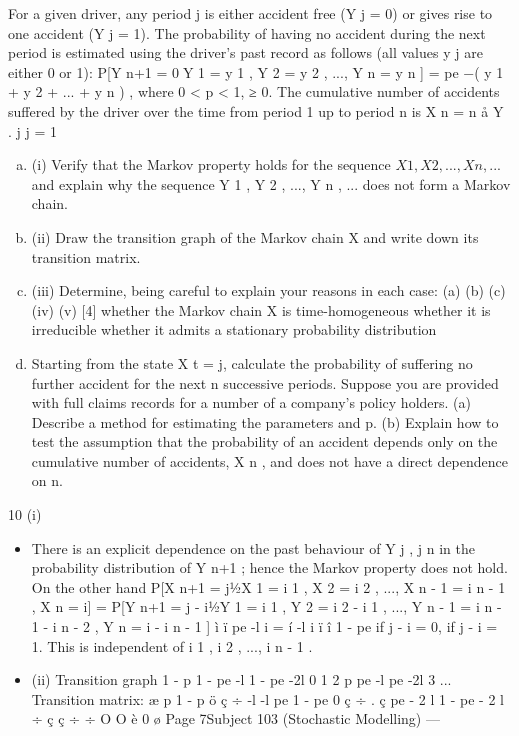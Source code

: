 \documentclass[a4paper,12pt]{article}
\begin{document}
\begin{enumerate} For a given driver, any period j is either accident free (Y j = 0) or gives rise to one
accident (Y j = 1). The probability of having no accident during the next period is
estimated using the driver’s past record as follows (all values y j are either 0 or 1):
P[Y n+1 = 0Y 1 = y 1 , Y 2 = y 2 , ..., Y n = y n ] = pe −\lambda ( y 1 + y 2 + ... + y n ) ,
where 0 < p < 1, \lambda ≥ 0. The cumulative number of accidents suffered by the
driver over the time from period 1 up to period n is
X n =
n
å Y .
j
j = 1

\begin{enumerate}[(a)]

\item (i) Verify that the Markov property holds for the sequence $X 1 , X 2 , ..., X n , ...$
and explain why the sequence Y 1 , Y 2 , ..., Y n , ... does not form a Markov
chain.
\item 
(ii) Draw the transition graph of the Markov chain X and write down its
transition matrix.

\item (iii) Determine, being careful to explain your reasons in each case:
(a)
(b)
(c)
(iv)
(v)
[4]
whether the Markov chain X is time-homogeneous
whether it is irreducible
whether it admits a stationary probability distribution 

\item Starting from the state X t = j, calculate the probability of suffering no
further accident for the next n successive periods. 
Suppose you are provided with full claims records for a number of a
company’s policy holders.
(a) Describe a method for estimating the parameters \lambda and p.
(b) Explain how to test the assumption that the probability of an accident depends only on the cumulative number of accidents, X n ,
and does not have a direct dependence on n.

\end{enumerate}
\newpage
10
(i)
\begin{itemize}
\item There is an explicit dependence on the past behaviour of Y j , j \leq n in the
probability distribution of Y n+1 ; hence the Markov property does not hold.
On the other hand
P[X n+1 = j1⁄2X 1 = i 1 , X 2 = i 2 , ..., X n - 1 = i n - 1 , X n = i]
= P[Y n+1 = j - i1⁄2Y 1 = i 1 , Y 2 = i 2 - i 1 , ..., Y n - 1 = i n - 1 - i n - 2 , Y n = i - i n - 1 ]
ì ï pe -l i
= í
-l i
ï
î 1 - pe
if j - i = 0,
if j - i = 1.
This is independent of i 1 , i 2 , ..., i n - 1 .
\item (ii)
Transition graph
1 - p
1 - pe -l
1 - pe -2l
0 1 2
p pe -l pe -2l
3
...
Transition matrix:
æ p 1 - p
ö
ç
÷
-l
-l
pe
1 - pe
0
ç
÷ .
ç
pe - 2 l
1 - pe - 2 l ÷
ç ç
÷ ÷
O
O
è 0
ø
Page 7Subject 103 (Stochastic Modelling) — 


\end{itemize}
\end{enumerate}
\end{document}
